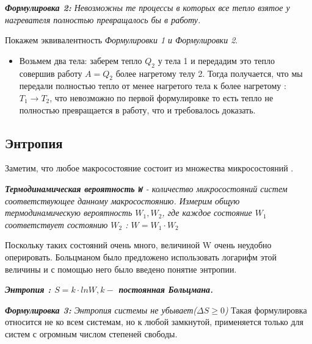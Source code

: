 \vspace{5px}

\textit{\textbf{Формулировка 2:} Невозможны те процессы в которых все тепло взятое у нагревателя полностью превращалось бы в работу.}

\vspace{5px}

Покажем эквивалентность\textit{ Формулировки 1 и Формулировки 2}.

\vspace{4px}
\begin{itemize}
    \item Возьмем два тела: заберем тепло $Q_2$ у тела 1 и передадим это тепло совершив работу $A = Q_2$ более нагретому телу 2. Тогда получается, что мы передали полностью тепло от менее нагретого тела к более нагретому : $T_1 \to T_2$, что невозможно по первой формулировке то есть тепло не полностью превращается в работу, что и требовалось доказать.
\end{itemize}
\subsection{Энтропия}
Заметим, что любое макросостояние состоит из множества микросостояний .

\vspace{4px}

 \textit{\textbf{Термодинамическая вероятность \texttt{W}} - количество микросостояний систем соответствующее данному макросостоянию. Измерим общую термодинамическую вероятность $W_1, W_2$, где каждое состояние $W_1$ соответствует состоянию $W_2$ : $W = W_1 \cdot W_2$}

\vspace{4px}

Поскольку таких состояний очень много, величиной W очень неудобно оперировать. Больцманом было предложено использовать логарифм этой величины и с помощью него было введено понятие энтропии.

\vspace{5px}

\textit{\textbf{Энтропия : $S = k \cdot ln{W}, k - $ постоянная Больцмана.}}

\vspace{5px}

\textit{\textbf{Формулировка 3: }Энтропия системы не убывает($\Delta S \geq  0 $)}
Такая формулировка относится не ко всем системам, но к любой замкнутой, применяется только для систем с огромным числом степеней свободы.

